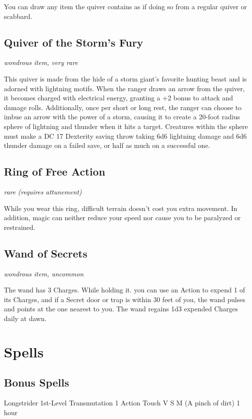 \documentclass[letterpaper,openany,oneside,twocolumn]{book}
\begin{document}
You can draw any item the quiver contains as if doing so from a regular quiver or scabbard.

\subsection*{Quiver of the Storm's Fury}
\textit{wondrous item, very rare}

This quiver is made from the hide of a storm giant's favorite hunting beast and is adorned with lightning motifs. When the ranger draws an arrow from the quiver, it becomes charged with electrical energy, granting a +2 bonus to attack and damage rolls. Additionally, once per short or long rest, the ranger can choose to imbue an arrow with the power of a storm, causing it to create a 20-foot radius sphere of lightning and thunder when it hits a target. Creatures within the sphere must make a DC 17 Dexterity saving throw taking 6d6 lightning damage and 6d6 thunder damage on a failed save, or half as much on a successful one.

\subsection*{Ring of Free Action}
\textit{rare (requires attunement)}

While you wear this ring, difficult terrain doesn't cost you extra movement. In addition, magic can neither reduce your speed nor cause you to be paralyzed or restrained.

\subsection*{Wand of Secrets}
\textit{wondrous item, uncommon}

The wand has 3 Charges. While holding it. you can use an Action to expend 1 of its Charges, and if a Secret door or trap is within 30 feet of you, the wand pulses and points at the one nearest to you. The wand regains 1d3 expended Charges daily at dawn.

\section*{Spells}

\subsection*{Bonus Spells}

\DndSpellHeader
  {Longstrider}
  {1st-Level Transmutation}
  {1 Action}
  {Touch}
  {V S M (A pinch of dirt)}
  {1 hour}
\end{document}
